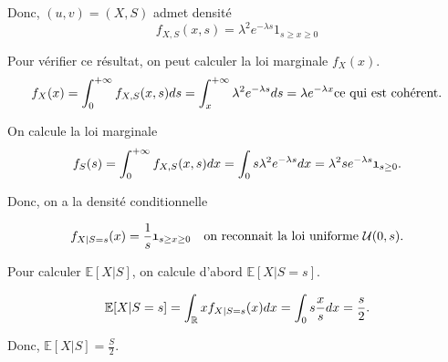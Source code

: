 \documentclass[french]{article}
\begin{document}
{	Donc, $(u,v) = (X,S)$ admet densité
	\begin{equation}
		f_{X,S}(x,s) = \lambda^2 e^{-\lambda s} \mathfrak{1}_{s \geq x \geq 0}
	\end{equation}
	
	\begin{tcolorbox}[colback=yellow!5!white,colframe=yellow!75!black]
		Pour vérifier ce résultat, on peut calculer la loi marginale $f_X(x)$.
		\begin{dmath}
			f_X(x) = \int_{0}^{+\infty} f_{X,S}(x,s) ds \\
					  = \int_{x}^{+\infty} \lambda^2 e^{-\lambda s} ds \\
					  = \lambda e^{-\lambda x} \text{ce qui est cohérent}.
		\end{dmath}
	\end{tcolorbox}

	On calcule la loi marginale
	\begin{dmath}
		f_S(s) = \int_{0}^{+\infty} f_{X,S}(x,s) dx \\ = \int_{0}{s} \lambda^2 e^{-\lambda s} dx \\ = \lambda^2 s e^{-\lambda s} \mathfrak{1}_{s \geq 0}.
	\end{dmath}

	Donc, on a la densité conditionnelle
	
	\begin{equation}
		f_{X|S=s}(x) = \frac{1}{s} \mathfrak{1}_{s \geq x \geq 0} \text{\quad on reconnait la loi uniforme $\mathcal{U}(0,s)$}.
	\end{equation}
	
	Pour calculer $\mathbb{E}[X|S]$, on calcule d'abord $\mathbb{E}[X|S=s]$.
	
	\begin{dmath}
		\mathbb{E}[X|S=s] = \int_{\mathbb{R}} x f_{X|S=s}(x) dx \\ = \int_{0}{s} \frac{x}{s} dx \\ = \frac{s}{2}.
	\end{dmath}

	Donc, $\mathbb{E}[X|S] = \frac{S}{2}$.
	
}
\end{document}
